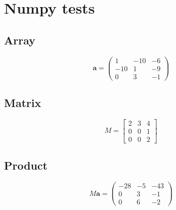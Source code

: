 \documentclass{article}%
\begin{document}
%
\normalsize%
\section{Numpy tests}%
\subsection{Array}%
\[%
\mathbf{a} = \begin{pmatrix}%
1&-10&-6\\%
-10&1&-9\\%
0&3&-1%
\end{pmatrix}%
\]

%
\subsection{Matrix}%
\[%
M= \begin{bmatrix}%
2&3&4\\%
0&0&1\\%
0&0&2%
\end{bmatrix}%
\]

%
\subsection{Product}%
\[%
M \mathbf{a} = \begin{pmatrix}%
-28&-5&-43\\%
0&3&-1\\%
0&6&-2%
\end{pmatrix}%
\]

%
\end{document}
